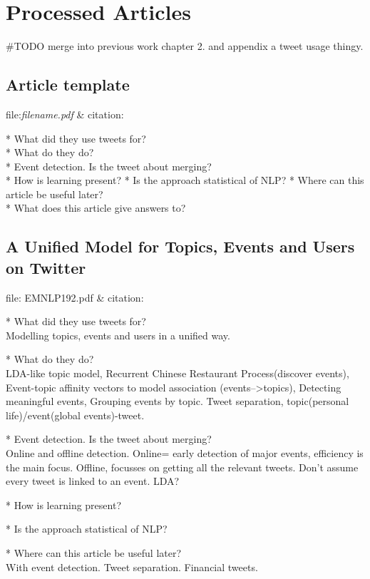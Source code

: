 \chapter{Processed Articles}

#TODO merge into previous work chapter 2. and appendix a tweet usage thingy.

\section{Article template}
file:\textit{filename.pdf} & citation:\cite[]{}  

* What did they use tweets for?\\
* What do they do?\\
* Event detection. Is the tweet about merging? \\
* How is learning present?
* Is the approach statistical of NLP? 
* Where can this article be useful later? \\
* What does this article give answers to?\\


\section{A Unified Model for Topics, Events and Users on Twitter}
file: EMNLP192.pdf &
citation:\cite[]{diao-jiang:2013:EMNLP}

* What did they use tweets for?\\
Modelling topics, events and users in a unified way. 

* What do they do?\\
LDA-like topic model, 
Recurrent Chinese Restaurant Process(discover events), 
Event-topic affinity vectors to model association (events-->topics),
Detecting meaningful events, 
Grouping events by topic. 
Tweet separation, topic(personal life)/event(global events)-tweet.


* Event detection. Is the tweet about merging? \\
Online and offline detection. Online= early detection of major events,
efficiency is the main focus. 
Offline, focusses on getting all the relevant tweets. 
Don't assume every tweet is linked to an event. 
LDA?

* How is learning present?

* Is the approach statistical of NLP?

* Where can this article be useful later? \\
With event detection. Tweet separation. Financial tweets.  

